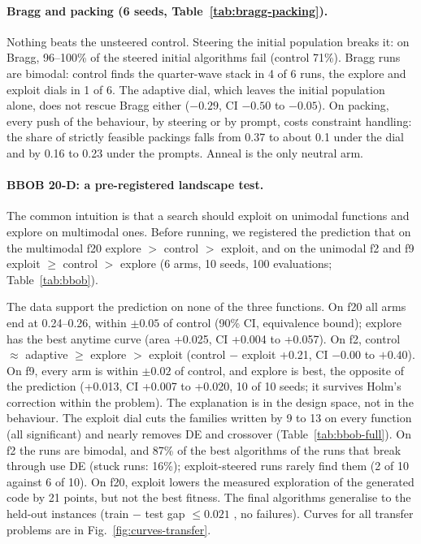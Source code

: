 \paragraph{Bragg and packing (6 seeds, Table~\ref{tab:bragg-packing}).}
Nothing beats the unsteered control. Steering the initial population
breaks it: on Bragg, 96--100\% of the steered initial algorithms fail
(control 71\%). Bragg runs are bimodal: control finds the quarter-wave
stack in 4 of 6 runs, the explore and exploit dials in 1 of 6. The
adaptive dial, which leaves the initial population alone, does not
rescue Bragg either ($-0.29$, CI $-0.50$ to $-0.05$). On packing, every
push of the behaviour, by steering or by prompt, costs constraint
handling: the share of strictly feasible packings falls from 0.37 to
about 0.1 under the dial and by 0.16 to 0.23 under the prompts. Anneal
is the only neutral arm.

\paragraph{BBOB 20-D: a pre-registered landscape test.}
The common intuition is that a search should exploit on unimodal
functions and explore on multimodal ones. Before running, we registered
the prediction that on the multimodal f20 explore $>$ control $>$
exploit, and on the unimodal f2 and f9 exploit $\ge$ control $>$
explore (6 arms, 10 seeds, 100 evaluations; Table~\ref{tab:bbob}).

The data support the prediction on none of the three functions. On
f20 all arms end at 0.24--0.26, within $\pm0.05$ of control (90\% CI,
equivalence bound); explore has the best anytime curve (area +0.025, CI
+0.004 to +0.057). On f2, control $\approx$ adaptive $\ge$ explore $>$ exploit
(control $-$ exploit +0.21, CI $-0.00$ to $+0.40$). On f9, every arm is
within $\pm0.02$ of control, and explore is best, the opposite of the
prediction (+0.013, CI +0.007 to +0.020, 10 of 10 seeds; it survives
Holm's correction within the problem). The explanation is
in the design space, not in the behaviour. The exploit dial cuts the
families written by 9 to 13 on every function (all significant) and
nearly removes DE and crossover (Table~\ref{tab:bbob-full}). On f2 the
runs are bimodal, and 87\% of the best algorithms of the runs that break
through use DE (stuck runs: 16\%); exploit-steered runs rarely find
them (2 of 10 against 6 of 10). On f20, exploit lowers the measured
exploration of the generated code by 21 points, but not the best
fitness. The final algorithms generalise to the held-out instances
(train $-$ test gap $\le0.021$ \aocc, no failures). Curves for all
transfer problems are in Fig.~\ref{fig:curves-transfer}.

